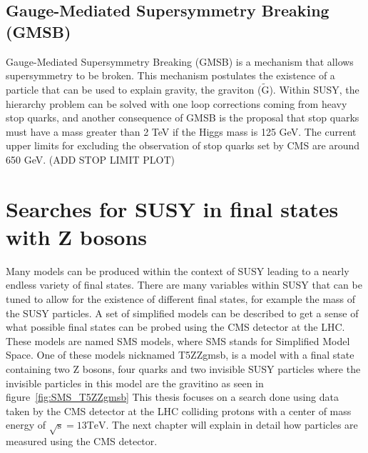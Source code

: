 \subsection{Gauge-Mediated Supersymmetry Breaking (GMSB)}
Gauge-Mediated Supersymmetry Breaking (GMSB) is a mechanism that allows supersymmetry to be broken.
This mechanism postulates the existence of a particle that can be used to explain gravity, the graviton ($\mathrm{\tilde{G}}$).
Within SUSY, the hierarchy problem can be solved with one loop corrections coming from heavy stop quarks,
and another consequence of GMSB is the proposal that stop quarks must have a mass greater than 2 TeV if the Higgs mass is 125 GeV.
The current upper limits for excluding the observation of stop quarks set by CMS are around 650 GeV. (ADD STOP LIMIT PLOT)

\section{Searches for SUSY in final states with Z bosons}
\label{sec:signalmodel}
Many models can be produced within the context of SUSY leading to a nearly endless variety of final states.
There are many variables within SUSY that can be tuned to allow for the existence of different final states, for example the mass of the SUSY particles.
A set of simplified models can be described to get a sense of what possible final states can be probed using the CMS detector at the LHC.
These models are named SMS models, where SMS stands for Simplified Model Space.
One of these models nicknamed T5ZZgmsb, is a model with a final state containing two Z bosons,
four quarks and two invisible SUSY particles where the invisible particles in this model are the gravitino as seen in figure~\ref{fig:SMS_T5ZZgmsb}
This thesis focuses on a search done using data taken by the CMS detector at the LHC colliding protons with a center of mass energy of $\mathrm{\sqrt{s}=13 TeV}$.
The next chapter will explain in detail how particles are measured using the CMS detector.

